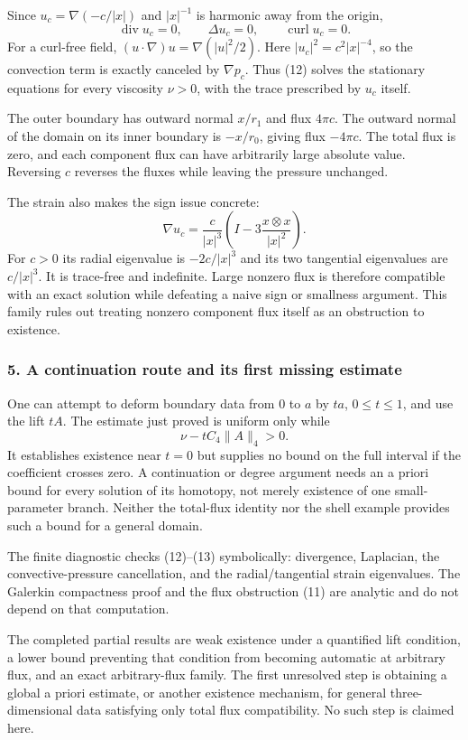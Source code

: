 \documentclass[11pt]{article}
\begin{document}
Since $u_c=\nabla(-c/|x|)$ and $|x|^{-1}$ is harmonic away from the origin,
\[
 \operatorname{div}u_c=0,\qquad \Delta u_c=0,
 \qquad \operatorname{curl}u_c=0.
\]
For a curl-free field, $(u\cdot\nabla)u=\nabla(|u|^2/2)$. Here $|u_c|^2=c^2|x|^{-4}$, so the convection term is exactly canceled by $\nabla p_c$. Thus (12) solves the stationary equations for every viscosity $\nu>0$, with the trace prescribed by $u_c$ itself.

The outer boundary has outward normal $x/r_1$ and flux $4\pi c$. The outward normal of the domain on its inner boundary is $-x/r_0$, giving flux $-4\pi c$. The total flux is zero, and each component flux can have arbitrarily large absolute value. Reversing $c$ reverses the fluxes while leaving the pressure unchanged.

The strain also makes the sign issue concrete:
\[
 \nabla u_c=\frac{c}{|x|^3}
 \left(I-3\frac{x\otimes x}{|x|^2}\right).
                                                               \tag{13}
\]
For $c>0$ its radial eigenvalue is $-2c/|x|^3$ and its two tangential eigenvalues are $c/|x|^3$. It is trace-free and indefinite. Large nonzero flux is therefore compatible with an exact solution while defeating a naive sign or smallness argument. This family rules out treating nonzero component flux itself as an obstruction to existence.

\subsubsection{5. A continuation route and its first missing estimate}
One can attempt to deform boundary data from $0$ to $a$ by $ta$, $0\leq t\leq1$, and use the lift $tA$. The estimate just proved is uniform only while
\[
 \nu-t C_4\|A\|_4>0.
\]
It establishes existence near $t=0$ but supplies no bound on the full interval if the coefficient crosses zero. A continuation or degree argument needs an a priori bound for every solution of its homotopy, not merely existence of one small-parameter branch. Neither the total-flux identity nor the shell example provides such a bound for a general domain.

The finite diagnostic checks (12)--(13) symbolically: divergence, Laplacian, the convective-pressure cancellation, and the radial/tangential strain eigenvalues. The Galerkin compactness proof and the flux obstruction (11) are analytic and do not depend on that computation.

The completed partial results are weak existence under a quantified lift condition, a lower bound preventing that condition from becoming automatic at arbitrary flux, and an exact arbitrary-flux family. The first unresolved step is obtaining a global a priori estimate, or another existence mechanism, for general three-dimensional data satisfying only total flux compatibility. No such step is claimed here.
\end{document}
